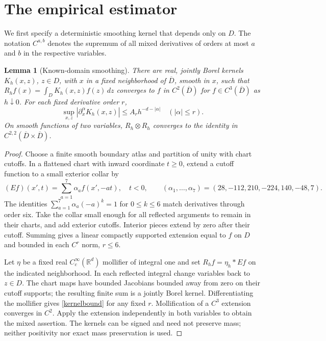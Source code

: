 \documentclass[11pt]{article}
\newtheorem{lemma}[theorem]{Lemma}
\theoremstyle{remark}\newtheorem{remark}[theorem]{Remark}
\newcommand{\R}{\mathbb R}
\begin{document}
\section{The empirical estimator}
We first specify a deterministic smoothing kernel that depends only on $D$.
The notation $C^{a,b}$ denotes the supremum of all mixed derivatives of
orders at most $a$ and $b$ in the respective variables.

\begin{lemma}[Known-domain smoothing]\label{kernel}
There are real, jointly Borel kernels $K_h(x,z)$, $z\in D$, with $x$ in a
fixed neighborhood of $\overline D$, smooth in $x$, such that
$R_h f(x)=\int_DK_h(x,z)f(z)\,dz$ converges to $f$ in
$C^2(\overline D)$ for $f\in C^3(\overline D)$ as $h\downarrow0$.
For each fixed derivative order $r$,
\begin{equation}\label{kernelbound}
 \sup_{x,z}|\partial_x^\alpha K_h(x,z)|\leq A_rh^{-d-|\alpha|}
 \quad (|\alpha|\leq r).
\end{equation}
On smooth functions of two variables, $R_h\otimes R_h$ converges to the
identity in $C^{2,2}(\overline D\times\overline D)$.
\end{lemma}
\begin{proof}
Choose a finite smooth boundary atlas and partition of unity with chart
cutoffs. In a flattened chart with inward coordinate $t\geq0$, extend a
cutoff function to a small exterior collar by
\begin{equation}\label{extension}
 (Ef)(x',t)=\sum_{a=1}^7\alpha_a f(x',-at),\quad t<0,
 \qquad (\alpha_1,\ldots,\alpha_7)=(28,-112,210,-224,140,-48,7).
\end{equation}
The identities $\sum_{a=1}^7\alpha_a(-a)^k=1$ for $0\leq k\leq6$
match derivatives through order six. Take the collar small enough for all
reflected arguments to remain in their charts, and add exterior cutoffs.
Interior pieces extend by zero after their cutoff. Summing gives a linear
compactly supported extension equal to $f$ on $D$ and bounded in each
$C^r$ norm, $r\leq6$.

Let $\eta$ be a fixed real $C_c^\infty(\R^d)$ mollifier of integral one
and set $R_h f=\eta_h*Ef$ on the indicated neighborhood. In each reflected
integral change variables back to $z\in D$. The chart maps have bounded
Jacobians bounded away from zero on their cutoff supports; the resulting
finite sum is a jointly Borel kernel. Differentiating the mollifier gives
\eqref{kernelbound} for any fixed $r$. Mollification of a $C^3$ extension
converges in $C^2$. Apply the extension independently in both variables to
obtain the mixed assertion. The kernels can be signed and need not preserve
mass; neither positivity nor exact mass preservation is used.
\end{proof}
\end{document}
